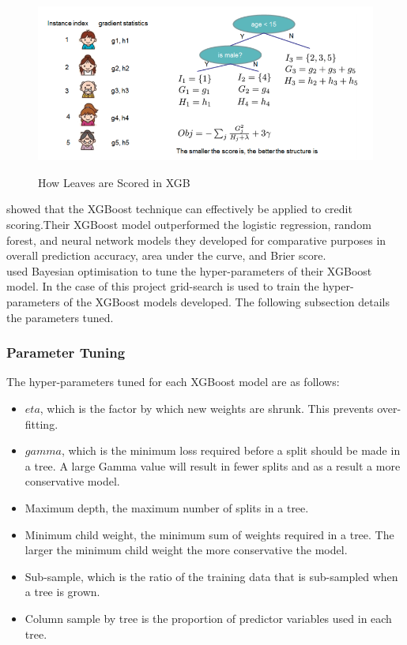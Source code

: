 \vspace{10 pt}

\begin{figure}[!htb]
\centering
\includegraphics[width=\textwidth]{images/tree_score.png}
\caption{How Leaves are Scored in XGB}
\label{fig:xgb_score}
\parencite{XGBoost}
\end{figure}

\vspace{10 pt}


\textcite{Ensemble} showed that the XGBoost technique can effectively be applied to credit scoring.Their XGBoost model outperformed the logistic regression, random forest, and neural network models they developed for comparative purposes in overall prediction accuracy, area under the curve, and Brier score. \\


\textcite{Ensemble} used Bayesian optimisation to tune the hyper-parameters of their XGBoost model. In the case of this project grid-search is used to train the hyper-parameters of the XGBoost models developed. The following subsection details the parameters tuned. 

\subsubsection{Parameter Tuning}

The hyper-parameters tuned for each XGBoost model are as follows:

\begin{itemize}
    \item $eta$, which is the factor by which new weights are shrunk. This prevents over-fitting.  
    \item $gamma$, which is the minimum loss required before a split should be made in a tree. A large Gamma value will result in fewer splits and as a result a more conservative model. 
    \item Maximum depth, the maximum number of splits in a tree. 
    \item Minimum child weight, the minimum sum of weights required in a tree. The larger the minimum child weight the more conservative the model. 
    \item Sub-sample, which is the ratio of the training data that is sub-sampled when a tree is grown. 
    \item Column sample by tree is the proportion of predictor variables used in each tree. 
\end{itemize}

